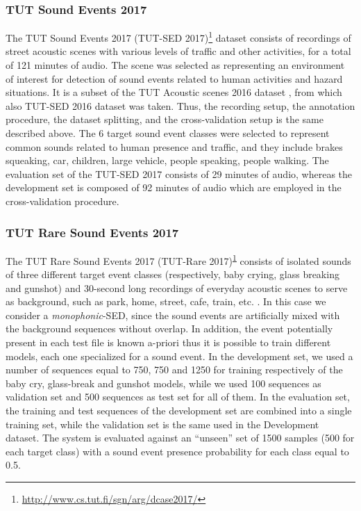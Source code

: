 \subsubsection{TUT Sound Events 2017}
The TUT Sound Events 2017 (TUT-SED 2017)\footnote{\label{note_dcase17}\url{http://www.cs.tut.fi/sgn/arg/dcase2017/}} dataset consists of recordings of street acoustic scenes with various levels of traffic and other activities, for a total of 121 minutes of audio. The scene was selected as representing an environment of interest for detection of sound events related to human activities and hazard situations. It is a subset of the TUT Acoustic scenes 2016 dataset \cite{mesaros2016tut}, from which also TUT-SED 2016 dataset was taken. Thus, the recording setup, the annotation procedure, the dataset splitting, and the cross-validation setup is the same described above. The 6 target sound event classes were selected to represent common sounds related to human presence and traffic, and they include brakes squeaking, car, children, large vehicle, people speaking, people walking. The evaluation set of the TUT-SED 2017 consists of 29 minutes of audio, whereas the development set is composed of 92 minutes of audio which are employed in the cross-validation procedure.

\subsubsection{TUT Rare Sound Events 2017} 
The TUT Rare Sound Events 2017 (TUT-Rare 2017)\textsuperscript{\ref{note_dcase17}} \cite{DCASE2017challenge} consists of isolated sounds of three different target event classes (respectively, baby crying, glass breaking and gunshot) and 30-second long recordings of everyday acoustic scenes to serve as background, such as park, home, street, cafe, train, etc. \cite{mesaros2016tut}. In this case we consider a \textit{monophonic}-SED, since the sound events are artificially mixed with the background sequences without overlap. In addition, the event potentially present in each test file is known a-priori thus it is possible to train different models, each one specialized for a sound event. In the development set, we used a number of sequences equal to 750, 750 and 1250 for training respectively of the baby cry, glass-break and gunshot models, while we used 100 sequences as validation set and 500 sequences as test set for all of them. In the evaluation set, the training and test sequences of the development set are combined into a single training set, while the validation set is the same used in the Development dataset. The system is evaluated against an ``unseen'' set of 1500 samples (500 for each target class) with a sound event presence probability for each class equal to 0.5.

